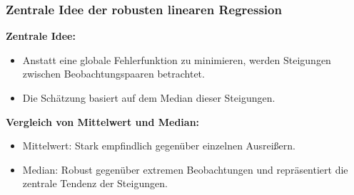 \documentclass{beamer}
\newif\ifpauseswitch
\begin{document}
	
	\begin{frame}
		\frametitle{Zentrale Idee der robusten linearen Regression}
		
		\textbf{Zentrale Idee:}
		\begin{itemize}
			\itemsep8pt
			\item Anstatt eine globale Fehlerfunktion zu minimieren, werden Steigungen zwischen Beobachtungspaaren betrachtet.
			\item Die Schätzung basiert auf dem Median dieser Steigungen.
		\end{itemize}
		
		\vspace{0.5em}
		
		\ifpauseswitch
		\pause
		\fi
		
		\textbf{Vergleich von Mittelwert und Median:}
		\begin{itemize}
			\itemsep8pt
			\item Mittelwert: Stark empfindlich gegenüber einzelnen Ausreißern.
			\item Median: Robust gegenüber extremen Beobachtungen und repräsentiert die zentrale Tendenz der Steigungen.
		\end{itemize}
	\end{frame}
	
\end{document}
